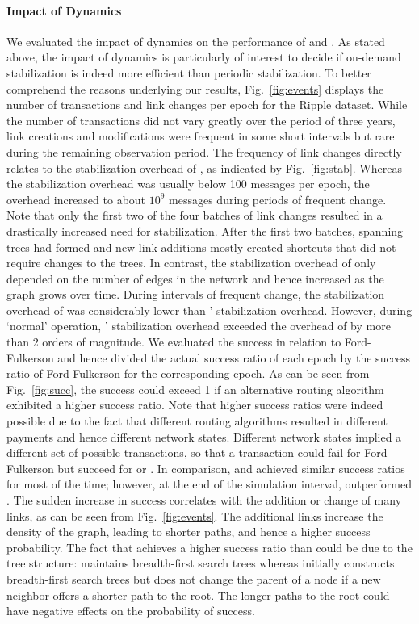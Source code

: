 \paragraph*{Impact of Dynamics} We evaluated the impact of dynamics on the performance of \oursys and \cnsysname . As stated above, the impact of dynamics is particularly of interest to decide if on-demand stabilization is indeed more efficient than periodic stabilization. 
To better comprehend the reasons underlying our results, Fig.~\ref{fig:events} displays the number of transactions and link changes per epoch for the Ripple dataset.
While the number of transactions did not vary greatly over the period of three years, link creations and modifications were frequent in some short intervals but rare during the remaining observation period. The frequency of link changes directly relates to the stabilization overhead of \oursys , as indicated by Fig.~\ref{fig:stab}. Whereas the stabilization overhead was usually below 100 messages per epoch, the overhead increased to about $10^9$ messages during periods of frequent change. Note that only the first two of the four batches of link changes resulted in a drastically increased need for stabilization. After the first two batches, spanning trees had formed and new link additions mostly created shortcuts that did not require changes to the trees. 
In contrast, the stabilization overhead of \cnsysname only depended on the number of edges in the network and hence increased as the graph grows over time. During intervals of frequent change, the stabilization overhead of \cnsysname was considerably lower than \oursys ' stabilization overhead. However, during `normal' operation, \cnsysname' stabilization overhead exceeded the overhead of \oursys by more than 2 orders of magnitude.  
We evaluated the success in relation to Ford-Fulkerson and hence  divided the actual success ratio of each epoch by the success ratio of Ford-Fulkerson for the corresponding epoch. 
As can be seen from Fig.~\ref{fig:succ}, the success could exceed 1 if an alternative routing algorithm exhibited a higher success ratio. Note that higher success ratios were indeed possible due to the fact that different routing algorithms resulted in different payments and hence different network states. Different network states implied a different set of possible transactions, so that a transaction could fail for Ford-Fulkerson but succeed for \cnsysname or \oursys. 
In comparison, \oursys and \cnsysname achieved similar success ratios for most of the time; however, at the end of the simulation interval, \cnsysname outperformed \oursys . The sudden increase in success correlates with the addition or change of many links, as can be seen from Fig.~\ref{fig:events}. The additional links increase the density of the graph, leading to shorter paths, and hence a higher success probability. The fact that \cnsysname achieves a higher success ratio than \oursys could be due to the tree structure: \cnsysname maintains breadth-first search trees whereas \oursys initially constructs breadth-first search trees but does not change the parent of a node if a new neighbor offers a shorter path to the root. The longer paths to the root could have negative effects on the probability of success. 
